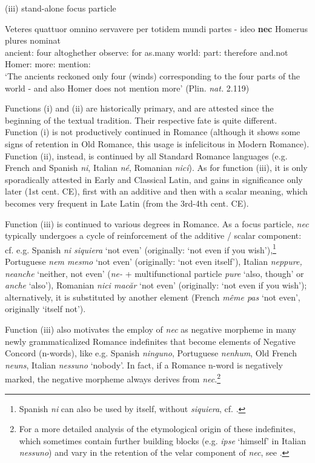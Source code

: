 \documentclass[output=paper,modfonts,nonflat,citecolor=brown,
showindex
]{langsci/langscibook}
\begin{document}
{\begin{exe}
\ex (iii) stand-alone focus particle 

\label{firstfocusnec} \gll Veteres quattuor omnino servavere per totidem mundi partes {- ideo} {\bf{nec}} Homerus plures nominat\\
ancient:{} four altoghether observe:{} for as.many world:{} part:{} therefore and.not Homer:{} more:{} mention:{}\\

`The ancients reckoned only four (winds) corresponding to the four parts of the world - and also Homer does not mention more' (Plin. {\em{nat.}} 2.119)
\end{exe}}

\noindent Functions (i) and (ii) are historically primary, and are attested since the beginning of the textual tradition. Their respective fate is quite different. Function (i) is not productively continued in Romance (although it shows some signs of retention in Old Romance, this usage is infelicitous in Modern Romance). Function (ii), instead, is continued by all Standard Romance languages (e.g. French and Spanish {\em{ni}}, Italian {\em{n\'e}}, Romanian {\em{nici}}). As for function (iii), it is only sporadically attested in Early and Classical Latin, and gains in significance only later (1st cent. CE), first with an additive and then with a scalar meaning, which becomes very frequent in Late Latin (from the 3rd-4th cent. CE). 

Function (iii) is continued to various degrees in Romance. As a focus particle, {\em{nec}} typically undergoes a cycle of reinforcement of the additive / scalar component: cf. e.g. Spanish {\em{ni siquiera}} `not even' (originally: `not even if you wish'),{\footnote{Spanish {\em{ni}} can also be used by itself, without {\em{siquiera}}, cf. \citet[]{Aranovich06}.}} Portuguese {\em{nem mesmo}} `not even' (originally: `not even itself'), Italian {\em{neppure, neanche}} `neither, not even' ({\em{ne-}} + multifunctional particle {\em{pure}} `also, though' or {\em{anche}} `also'), Romanian {\em{nici mac\u{a}r}} `not even' (originally: `not even if you wish'); alternatively, it is substituted by another element (French {\em{m\^eme pas}} `not even', originally `itself not'). 

Function (iii) also motivates the employ of {\em{nec}} as negative morpheme in many newly grammaticalized Romance indefinites that become elements of Negative Concord (n-words), like e.g. Spanish {\em{ninguno}}, Portuguese {\em{nenhum}}, Old French {\em{neuns}}, Italian {\em{nessuno}} `nobody'. In fact, if a Romance n-word is negatively marked, the negative morpheme always derives from {\em{nec}}.{\footnote{For a more detailed analysis of the etymological origin of these indefinites, which sometimes contain further building blocks (e.g. {\em{ipse}} `himself' in Italian {\em{nessuno}}) and vary in the retention of the velar component of {\em{nec}}, see \citet[225-228]{Gianollo18}.}} 
\end{document}
